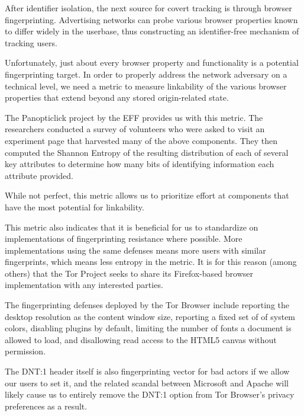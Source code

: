 \documentclass[letterpaper,11pt]{llncs}
\begin{document}
After identifier isolation, the next source for covert tracking is through
browser fingerprinting. Advertising networks can probe various browser
properties known to differ widely in the userbase, thus constructing an
identifier-free mechanism of tracking users.

Unfortunately, just about every browser property and functionality is a
potential fingerprinting target. In order to properly address the network
adversary on a technical level, we need a metric to measure linkability of the
various browser properties that extend beyond any stored origin-related state.

The Panopticlick project by the EFF provides us with this
metric\cite{panopticlick}. The researchers conducted a survey of volunteers
who were asked to visit an experiment page that harvested many of the above
components. They then computed the Shannon Entropy of the resulting
distribution of each of several key attributes to determine how many bits of
identifying information each attribute provided.

While not perfect\footnotemark, this metric allows us to prioritize effort at
components that have the most potential for linkability.


This metric also indicates that it is beneficial for us to standardize on
implementations of fingerprinting resistance where possible. More
implementations using the same defenses means more users with similar
fingerprints, which means less entropy in the metric. It is for this reason
(among others) that the Tor Project seeks to share its Firefox-based browser
implementation\cite{torbrowser} with any interested parties.

The fingerprinting defenses deployed by the Tor Browser include reporting the
desktop resolution as the content window size, reporting a fixed set of of
system colors, disabling plugins by default, limiting the number of fonts a
document is allowed to load, and disallowing read access to the HTML5 canvas
without permission.

The DNT:1 header itself is also fingerprinting vector for bad actors if we
allow our users to set it, and the related scandal between Microsoft and
Apache will likely cause us to entirely remove the DNT:1 option from Tor
Browser's privacy preferences as a result.
\end{document}
